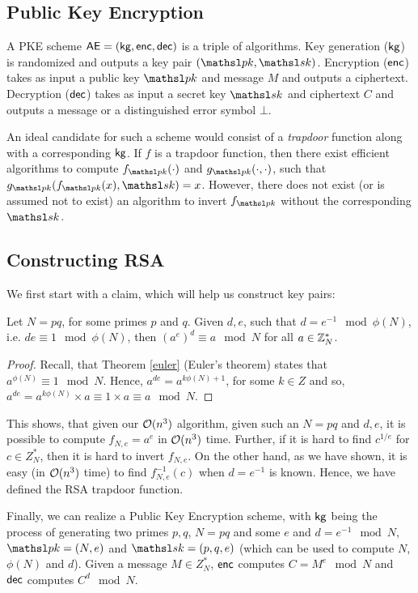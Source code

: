 \subsection{Public Key Encryption}
A PKE scheme $\textsf{AE} = ({\sf kg},{\sf enc},{\sf dec})$ is a triple of
algorithms. Key generation (${\sf kg}$) is randomized and outputs a key pair $(\pk,\sk)$.
Encryption (${\sf enc}$) takes as input a public key $\pk$ and message $M$ and outputs a ciphertext.
Decryption (${\sf dec}$) takes as input a secret key $\sk$ and ciphertext $C$ and outputs a
message or a distinguished error symbol $\bot$. 

An ideal candidate for such a scheme would consist of a \emph{trapdoor} function along with a corresponding ${\sf kg}$. If $f$ is a trapdoor function, then there exist efficient algorithms to compute $f_{\pk}(\cdot)$ and $g_{\pk}(\cdot, \cdot)$, such that $g_{\pk}(f_{\pk}(x), \sk) = x$. However, there does not exist (or is assumed not to exist) an algorithm to invert $f_{\pk}$ without the corresponding $\sk$.
\subsection{Constructing RSA}
We first start with a claim, which will help us construct key pairs:
\begin{claim}
Let $N = pq$, for some primes $p$ and $q$. Given $d, e$, such that $d = e^{-1} \mod \phi(N)$, i.e. $de\equiv 1\mod \phi(N)$, then $(a^e)^d \equiv a\mod N$ for all $a\in {{\mathbb Z}}^*_N$. 
\end{claim}
\begin{proof}
Recall, that Theorem \ref{euler} (Euler's theorem) states that $a^{\phi(N)}\equiv 1 \mod N$. Hence, $a^{de} = a^{k\phi(N) + 1}$, for some $k\in Z$ and so, $a^{de} = a^{k\phi(N)}\times a \equiv 1\times a \equiv a \mod N$. 
\end{proof}

This shows, that given our ${\cal O}(n^3)$ algorithm, given such an $N = pq$ and $d, e$, it is possible to compute $f_{N, e} = a^e$ in ${\cal O}(n^3)$ time. Further, if it is hard to find $c^{1/e}$ for $c\in Z^*_N$, then it is hard to invert $f_{N, e}$. On the other hand, as we have shown, it is easy (in ${\cal O}(n^3)$ time) to find $f^{-1}_{N, e}(c)$ when $d = e^{-1}$ is known.  Hence, we have defined the RSA trapdoor function.

Finally, we can realize a Public Key Encryption scheme, with ${\sf kg}$ being the process of generating two primes $p, q$, $N = pq$ and some $e$ and $d = e^{-1}\mod N$, $\pk = (N, e)$ and $\sk = (p, q, e)$ (which can be used to compute $N$, $\phi(N)$ and $d$). Given a message $M\in Z^{*}_N$, ${\sf enc}$ computes $C = M^e\mod N$ and ${\sf dec}$ computes $C^d\mod N$.

